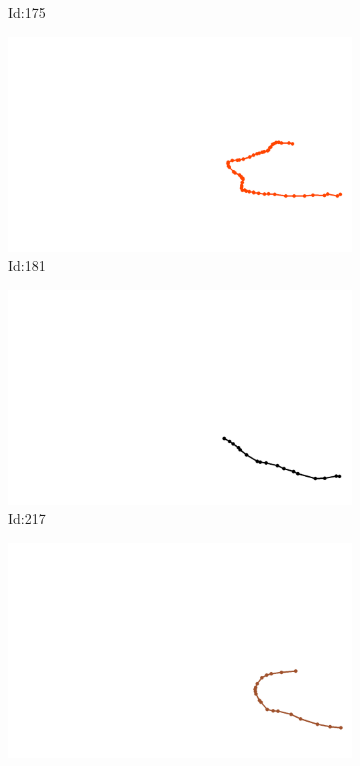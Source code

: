 \documentclass[12pt,twoside]{report}
\begin{document}
\begin{figure}
\begin{subfigure}[b]{0.20\textwidth}
\caption{Id:175}
\end{subfigure}
\begin{subfigure}[b]{0.20\textwidth}
\centering
\includegraphics[width=\textwidth]{../trajectories/181.png}
\caption{Id:181}
\end{subfigure}
\begin{subfigure}[b]{0.20\textwidth}
\centering
\includegraphics[width=\textwidth]{../trajectories/217.png}
\caption{Id:217}
\end{subfigure}
\begin{subfigure}[b]{0.20\textwidth}
\centering
\includegraphics[width=\textwidth]{../trajectories/226.png}

\end{subfigure}
\end{figure}
\end{document}
